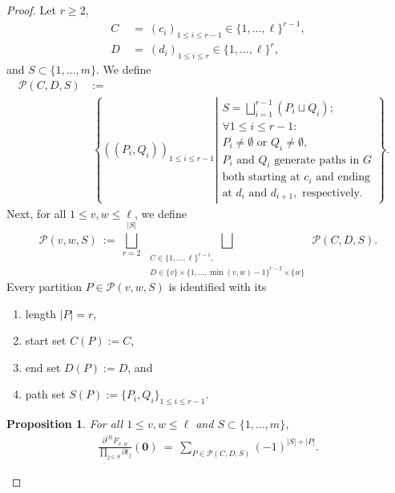 \documentclass[12pt, reqno, oneside]{amsart}
\newtheorem{proposition}[corollary]{Proposition}
\numberwithin{equation}{section}
\begin{document}
\begin{proof}
Let $r \geq 2$,
\begin{align*}
C \ &= \ (c_i)_{1 \leq i \leq r-1} \in \{1, \dots, \ell\}^{r-1},\\
D \ &= \ (d_i)_{1 \leq i \leq r} \in \{1, \dots, \ell\}^r,
\end{align*}
and $S \subset \{1, \dots, m\}$. We define
\begin{align}
    \nonumber
    \mathcal{P}(C,D,S) \ &:= & \\
    &\left\{((P_i,Q_i))_{1 \leq i \leq r-1} \left| \begin{array}{l}
        S = \bigsqcup_{i=1}^{r-1} (P_i \sqcup Q_i); \\
        \forall 1 \leq i \leq r-1: \\ 
        P_i \neq \emptyset \text{ or } Q_i \neq \emptyset, \\ 
        P_i \text{ and } Q_i \text{ generate paths in } G \\ 
        \text{both starting at } c_i \text{ and ending} \\
        \text{at } d_i \text{ and } d_{i+1}, \text{ respectively.}
    \end{array} \right.\right\}.
\end{align}
Next, for all $1 \leq v,w \leq \ell$, we define
\begin{equation}
    \mathcal{P}(v,w,S) \ := \ \bigsqcup_{r=2}^{|S|} \ \bigsqcup_{\substack{C \in \{1, \dots, \ell\}^{r-1}, \\ D \in \{v\} \times \{1, \dots, \min(v,w)-1\}^{r-2} \times \{w\}}} \ \mathcal{P}(C,D,S).
\end{equation}
Every partition $P \in \mathcal{P}(v,w,S)$ is identified with its
\begin{enumerate}
    \item length $|P| = r$,
    \item start set $C(P) := C$,
    \item end set $D(P) := D$, and
    \item path set $S(P) := \{P_i, Q_i\}_{1 \leq i \leq r-1}$.
\end{enumerate}



\begin{proposition}
    For all $1 \leq v, w \leq \ell$ and $S \subset \{1, \dots, m\}$, 
    \begin{align}
        \frac{\partial^{|S|}F_{v,w}}{\prod_{j \in S} \partial t_j}(\mathbf{0}) \ = \ \sum_{P \in \mathcal{P}(C,D,S)} (-1)^{|S|+|P|}.
    \end{align}
\end{proposition}


\end{proof}
\end{document}
